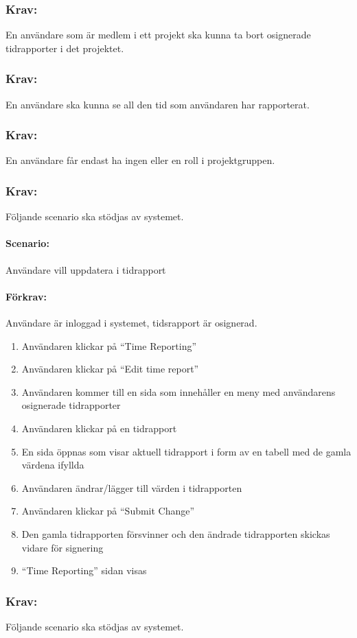 \documentclass[paper=a4, fontsize=11pt,twoside]{article}
\begin{document}
	\subsubsection{Krav:} En användare som är medlem i ett projekt ska kunna ta bort osignerade tidrapporter i det projektet.
	\subsubsection{Krav:}En användare ska kunna se all den tid som användaren har rapporterat.
	\subsubsection{Krav:}En användare får endast ha ingen eller en roll i projektgruppen.
	\subsubsection{Krav:} Följande scenario ska stödjas av systemet.
	\paragraph{Scenario:}Användare vill uppdatera i tidrapport
	\paragraph{Förkrav:}
	Användare är inloggad i systemet, tidsrapport är osignerad.
	\begin{enumerate}
		\item Användaren klickar på “Time Reporting”
		\item	Användaren klickar på “Edit time report”
		\item	Användaren kommer till en sida som innehåller en meny med användarens osignerade tidrapporter
		\item 	Användaren klickar på en tidrapport
		\item	En sida öppnas som visar aktuell tidrapport i form av en tabell med de gamla värdena ifyllda
		\item	Användaren ändrar/lägger till värden i tidrapporten
		\item	Användaren klickar på “Submit Change”
		\item	Den gamla tidrapporten försvinner och den ändrade tidrapporten skickas vidare för signering
		\item	“Time Reporting” sidan visas
		
	\end{enumerate}
	\subsubsection{Krav:}Följande scenario ska stödjas av systemet.
\end{document}
